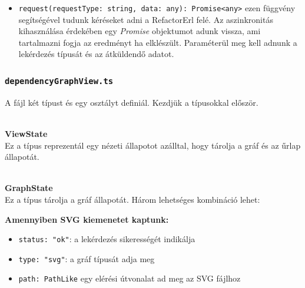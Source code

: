 \begin{itemize}
    \item \lstinline{request(requestType: string, data: any): Promise<any>} ezen függvény segítségével tudunk kéréseket adni a RefactorErl felé. Az aszinkronitás kihasználása érdekében egy \textit{Promise} objektumot adunk vissza, ami tartalmazni fogja az eredményt ha elklészült. Paraméterül meg kell adnunk a lekérdezés típusát és az átküldendő adatot.

\end{itemize}

\subsubsection{\lstinline{dependencyGraphView.ts}}

A fájl két típust és egy osztályt definiál. Kezdjük a típusokkal először.



\\
\vspace{14pt}
\textbf{ViewState}
\\

Ez a típus reprezentál egy nézeti állapotot azálltal, hogy tárolja a gráf és az űrlap állapotát.

\begin{itemize}
    \item \lstinline{graph: GraphState | undefined}: a gráf állapota
    
    \item \lstinline{formState: DependencyGraphState | undefined: az űrlap állapota

\end{itemize}






\\
\vspace{14pt}
\textbf{GraphState}
\\

Ez a típus tárolja a gráf állapotát. Három lehetséges kombináció lehet:

\noindent \textbf{Amennyiben SVG kiemenetet kaptunk:}
\begin{itemize}
    \item \lstinline{status: "ok"}: a lekérdezés sikerességét indikálja
    \item \lstinline{type: "svg"}: a gráf típusát adja meg
    \item \lstinline{path: PathLike} egy elérési útvonalat ad meg az SVG fájlhoz
\end{itemize}

